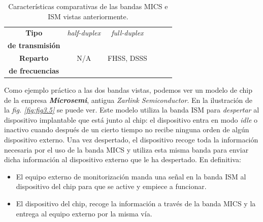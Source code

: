 \begin{table}[h]
{\begin{tabular}{| c | c | c | c | c | c |}
            \hline
            \large{\textbf{Tipo}}               & \textit{half-duplex}        & \textit{full-duplex}             \\
            \large{\textbf{de transmisión}}     &                             &                                  \\
            \hline
            \large{\textbf{Reparto}}            & N/A                         & FHSS, DSSS                       \\
            \large{\textbf{de frecuencias}}     &                             &                                  \\
            \hline
            \hline
        \end{tabular}}
    \caption{Características comparativas de las bandas MICS e ISM vistas anteriormente.}
    \label{tab:tabla3.2}
\end{table}

Como ejemplo práctico a las dos bandas vistas, podemos ver un modelo de chip de la empresa \textbf{\textit{Microsemi}}, antigua \textit{Zarlink Semiconductor}. En la ilustración de la \textit{fig. \ref{fig:fig3.5}} se puede ver. Este modelo utiliza la banda ISM para \textit{despertar} al dispositivo implantable que está junto al chip: el dispositivo entra en modo \textit{idle} o inactivo cuando después de un cierto tiempo no recibe ninguna orden de algún dispositivo externo. Una vez despertado, el dispositivo recoge toda la información necesaria por el uso de la banda MICS y utiliza esta misma banda para enviar dicha información al dispositivo externo que le ha despertado. En definitiva:

\begin{itemize}
    \item El equipo externo de monitorización manda una señal en la banda ISM al dispositivo del chip para que se active y empiece a funcionar.
    \item El dispositivo del chip, recoge la información a través de la banda MICS y la entrega al equipo externo por la misma vía.
\end{itemize}

